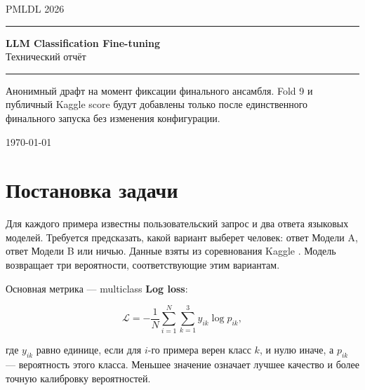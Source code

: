 \documentclass[a4paper,11pt]{article}
\newcommand{\metric}{\textbf{Log loss}}
\begin{document}
\begin{titlepage}
\thispagestyle{empty}
\begin{center}
  \vspace*{2.7cm}
  {\Large\color{accent}\MakeUppercase{PMLDL 2026}}\\[0.8em]
  {\color{navy}\rule{0.78\textwidth}{1.1pt}}\par\vspace{1.2em}
  {\Huge\bfseries\color{navy} LLM Classification Fine-tuning}\\[0.65em]
  {\Large Технический отчёт}\\[1.25em]
  {\color{navy}\rule{0.78\textwidth}{1.1pt}}\par\vspace{2.0em}
  \begin{tcolorbox}[colback=lightblue,colframe=lightblue,width=0.84\textwidth,arc=1.5mm]
    \centering\small
    Анонимный драфт на момент фиксации финального ансамбля.\newline
    Fold 9 и публичный Kaggle score будут добавлены только после единственного
    финального запуска без изменения конфигурации.
  \end{tcolorbox}
  \vfill
  {\small \today}
\end{center}
\end{titlepage}

\section{Постановка задачи}

Для каждого примера известны пользовательский запрос и два ответа языковых
моделей. Требуется предсказать, какой вариант выберет человек: ответ Модели A,
ответ Модели B или ничью. Данные взяты из соревнования Kaggle
\cite{kaggle}. Модель возвращает три вероятности, соответствующие этим
вариантам.

Основная метрика --- multiclass \metric:

\begin{equation}
  \mathcal{L} = -\frac{1}{N}\sum_{i=1}^{N}\sum_{k=1}^{3}
  y_{ik}\log p_{ik},
  \label{eq:logloss}
\end{equation}

где $y_{ik}$ равно единице, если для $i$-го примера верен класс $k$, и нулю
иначе, а $p_{ik}$ --- вероятность этого класса. Меньшее значение означает
лучшее качество и более точную калибровку вероятностей.
\end{document}
